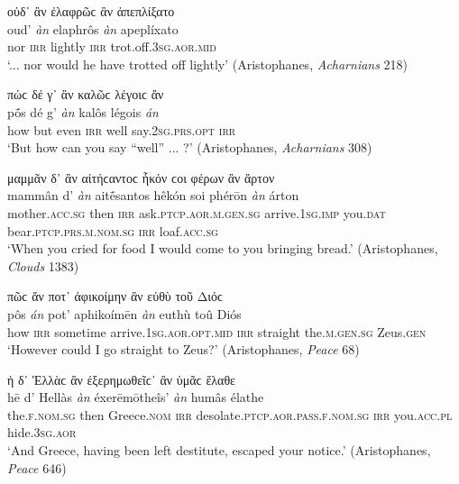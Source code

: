 \begin{exe}
\ex οὐδ᾽ ἂν ἐλαφρῶϲ ἂν ἀπεπλίξατο\\
\gll oud' \emph{àn} elaphrôs \emph{àn} apeplíxato\\
nor \textsc{irr} lightly \textsc{irr} trot.off.\textsc{3sg.aor.mid}\\
\trans `... nor would he have trotted off lightly' (Aristophanes, \textit{Acharnians} 218)
\label{multian46}
\end{exe}

\begin{exe}
\ex πώϲ δέ γ᾽ ἂν καλῶϲ λέγοιϲ ἄν\\
\gll pṓs dé g' \emph{àn} kalôs légois \emph{án}\\
how but even \textsc{irr} well say.\textsc{2sg.prs.opt} \textsc{irr}\\
\trans `But how can you say ``well'' ... ?' (Aristophanes, \textit{Acharnians} 308)
\label{multian47}
\end{exe}

\begin{exe}
\ex μαμμᾶν δ᾽ ἂν αἰτήϲαντοϲ ἧκόν ϲοι φέρων ἂν ἄρτον\\
\gll mammân d' \emph{àn} aitḗsantos hêkón soi phérōn \emph{àn} árton\\
mother.\textsc{acc.sg} then \textsc{irr} ask.\textsc{ptcp.aor.m.gen.sg} arrive.\textsc{1sg.imp} you.\textsc{dat} bear.\textsc{ptcp.prs.m.nom.sg} \textsc{irr} loaf.\textsc{acc.sg}\\
\trans `When you cried for food I would come to you bringing bread.' (Aristophanes, \textit{Clouds} 1383)
\label{multian48}
\end{exe}

\begin{exe}
\ex πῶϲ ἄν ποτ᾽ ἀφικοίμην ἂν εὐθὺ τοῦ Διόϲ\\
\gll pôs \emph{án} pot' aphikoímēn \emph{àn} euthù toû Diós\\
how \textsc{irr} sometime arrive.\textsc{1sg.aor.opt.mid} \textsc{irr} straight the.\textsc{m.gen.sg} Zeus.\textsc{gen}\\
\trans `However could I go straight to Zeus?' (Aristophanes, \textit{Peace} 68)
\label{multian49}
\end{exe}

\begin{exe}
\ex ἡ δ᾽ Ἑλλὰϲ ἂν έξερημωθεῖϲ᾽ ἂν ὑμᾶϲ ἔλαθε\\
\gll hē d' Hellàs \emph{àn} éxerēmōtheîs' \emph{àn} humâs élathe\\
the.\textsc{f.nom.sg} then Greece.\textsc{nom} \textsc{irr} desolate.\textsc{ptcp.aor.pass.f.nom.sg} \textsc{irr} you.\textsc{acc.pl} hide.\textsc{3sg.aor}\\
\trans `And Greece, having been left destitute, escaped your notice.' (Aristophanes, \textit{Peace} 646)
\label{multian50}
\end{exe}

